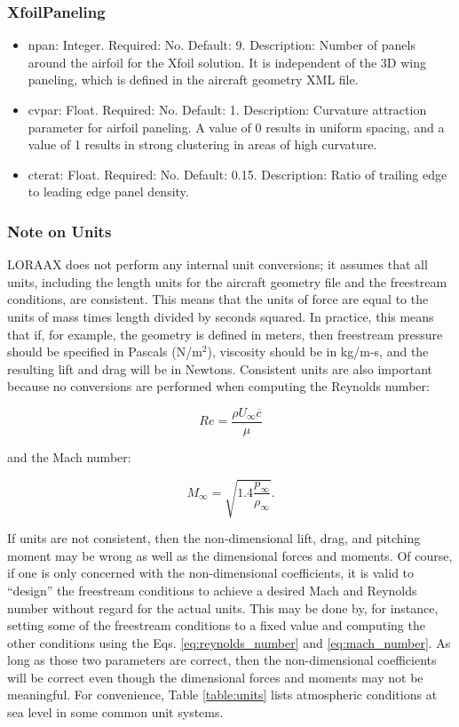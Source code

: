 \documentclass[11pt]{article}
\begin{document}
\subsubsection{XfoilPaneling}

\begin{itemize}
	\item npan: Integer. Required: No. Default: 9. Description: Number of panels
		around the airfoil for the Xfoil solution. It is independent of the 3D
		wing paneling, which is defined in the aircraft geometry XML file.
	\item cvpar: Float. Required: No. Default: 1. Description: Curvature
		attraction parameter for airfoil paneling. A value of 0 results in
		uniform spacing, and a value of 1 results in strong clustering in
		areas of high curvature.
	\item cterat: Float. Required: No. Default: 0.15. Description: Ratio of
		trailing edge to leading edge panel density.
\end{itemize}

\subsubsection{Note on Units}

LORAAX does not perform any internal unit conversions; it assumes that all
units, including the length units for the aircraft geometry file and the
freestream conditions, are consistent. This means that the units of force are
equal to the units of mass times length divided by seconds squared. In practice,
this means that if, for example, the geometry is defined in meters, then
freestream pressure should be specified in Pascals (N/m$^2$), viscosity should
be in kg/m-s, and the resulting lift and drag will be in Newtons.
Consistent units are also important because no conversions are performed when
computing the Reynolds number:

\begin{equation}
	Re = \frac{\rho U_\infty \overline{c}}{\mu}
	\label{eq:reynolds_number}
\end{equation}

\noindent and the Mach number:

\begin{equation}
	M_\infty = \sqrt{1.4\frac{p_\infty}{\rho_\infty}}.
	\label{eq:mach_number}
\end{equation}

If units are not consistent, then the non-dimensional lift, drag, and pitching
moment may be wrong as well as the dimensional forces and moments. Of course,
if one is only concerned with the non-dimensional coefficients, it is valid to
``design'' the freestream conditions to achieve a desired
Mach and Reynolds number without regard for the actual units. This may be done
by, for instance, setting some of the freestream conditions to a fixed value
and computing the other conditions using the Eqs. \ref{eq:reynolds_number} and
\ref{eq:mach_number}.
As long as those two parameters are correct, then the
non-dimensional coefficients will be correct even though the dimensional forces
and moments may not be meaningful. For convenience, Table \ref{table:units}
lists atmospheric conditions at sea level in some common unit systems.
\end{document}
